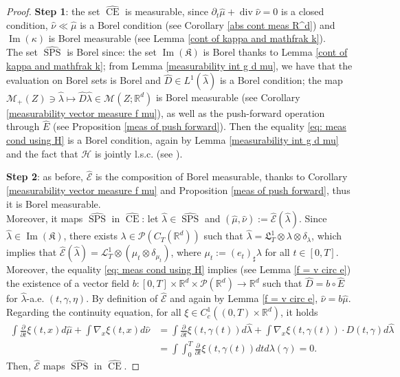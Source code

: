 \documentclass[10pt,leqno]{amsart}
\numberwithin{equation}{section}
\newcommand{\R}{\mathbb{R}}
\newcommand{\PP}{\mathcal{P}}
\newcommand{\CE}{\operatorname{CE}}
\begin{document}
\begin{proof}
    \textbf{Step 1}: the set $\hat{\operatorname{CE}}$ is measurable, since $\partial_t\hat{\mu} + \operatorname{div}\hat{\nu} = 0$ is a closed condition, $\hat{\nu}\ll\hat{\mu}$ is a Borel condition (see Corollary \ref{abs cont meas R^d}) and $\operatorname{Im}(\kappa)$ is Borel measurable (see Lemma \ref{cont of kappa and mathfrak k}).
    \\
    The set $\hat{\operatorname{SPS}}$ is Borel since: the set $\operatorname{Im}(\mathfrak{K})$ is Borel thanks to Lemma \ref{cont of kappa and mathfrak k}; from Lemma \ref{measurability int g d mu}, we have that the evaluation on Borel sets is Borel and $\hat{D}\in L^1(\hat{\lambda})$ is a Borel condition; the map $\mathcal{M}_+(Z) \ni \hat{\lambda}\mapsto \hat{D}\hat{\lambda} \in \mathcal{M}(Z;\R^d)$ is Borel measurable (see Corollary \ref{measurability vector measure f mu}), as well as the push-forward operation through $\hat{E}$ (see Proposition \ref{meas of push forward}). Then the equality \eqref{eq: meas cond using H} is a Borel condition, again by Lemma \ref{measurability int g d mu} and the fact that $\mathcal{H}$ is jointly l.s.c. (see \cite[Chapter 2]{ambrosio2000functions}). 

    \textbf{Step 2}: as before, $\hat{\mathcal{E}}$ is the composition of Borel measurable, thanks to Corollary \ref{measurability vector measure f mu} and Proposition \ref{meas of push forward}, thus it is Borel measurable. \\
    Moreover, it maps $\hat{\operatorname{SPS}}$ in $\hat{\CE}$: let $\hat{\lambda}\in \hat{\operatorname{SPS}}$ and $(\hat{\mu},\hat{\nu}):= \hat{\mathcal{E}}(\hat{\lambda})$. Since $\hat{\lambda} \in \operatorname{Im}(\mathfrak{K})$, there exists $\lambda \in \PP(C_T(\R^d))$ such that $\hat{\lambda} = \mathfrak{L}^1_T\otimes \lambda \otimes \delta_\lambda$, which implies that $\hat{\mathcal{E}}(\hat{\lambda}) = \mathcal{L}^1_T\otimes (\mu_t\otimes\delta_{\mu_t})$, where $\mu_t := (e_t)_\sharp \lambda$ for all $t\in[0,T]$. Moreover, the equality \eqref{eq: meas cond using H} implies (see Lemma \ref{f = v circ e}) the existence of a vector field $b:[0,T]\times \R^d \times \PP(\R^d) \to \R^d$ such that $\hat{D} = b \circ \hat{E}$ for $\hat{\lambda}$-a.e. $(t,\gamma,\eta)$. By definition of $\hat{\mathcal{E}}$ and again by Lemma \ref{f = v circ e}, $\hat{\nu} = b\hat{\mu}$. Regarding the continuity equation, for all $\xi\in C_c^1((0,T)\times \R^d)$, it holds
    \begin{align*}
        \int \frac{\partial}{\partial t} \xi(t,x) d\hat{\mu} + \int \nabla_x \xi(t,x) d\hat{\nu} & = 
        \int \frac{\partial}{\partial t} \xi(t,\gamma(t)) d\hat{\lambda} + \int \nabla_x \xi(t,\gamma(t)) \cdot D(t,\gamma)d\hat{\lambda}
        \\
        & = 
        \int \int_0^T \frac{\partial}{\partial t}\xi(t,\gamma(t)) dt d\lambda(\gamma) = 0.
    \end{align*}
    Then, $\hat{\mathcal{E}} $ maps $\hat{\operatorname{SPS}}$ in $\hat{\operatorname{CE}}$. 


\end{proof}
\end{document}
